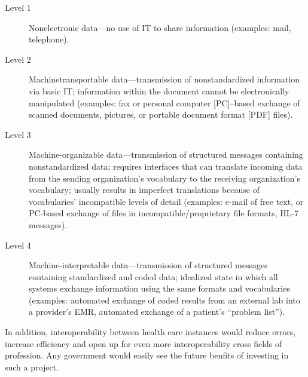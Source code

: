 \begin{description}
\item[Level 1]Nonelectronic data—no use of IT to share information (examples: mail, telephone).
\item[Level 2]Machinetransportable data—transmission of nonstandardized information via basic IT; information within the document cannot be electronically manipulated (examples: fax or personal computer [PC]–based exchange of scanned documents, pictures, or portable document format [PDF] files).
\item[Level 3]Machine-organizable data—transmission of structured messages containing nonstandardized data; requires interfaces that can translate incoming data from the sending organization’s vocabulary to the receiving organization’s vocabulary; usually results in imperfect translations because of vocabularies’ incompatible levels of detail (examples: e-mail of free text, or PC-based exchange of files in incompatible/proprietary file formats, HL-7 messages).
\item[Level 4]Machine-interpretable data—transmission of structured messages containing standardized and coded data; idealized state in which all systems exchange information using the same formats and vocabularies (examples: automated exchange of coded results from an external lab into a provider’s EMR, automated exchange of a patient’s “problem list”).
\end{description}
In addition, interoperability between health care instances would reduce errors, increase efficiency and open up for even more interoperability cross fields of profession. Any government would easily see the future benfits of investing in such a project.
 